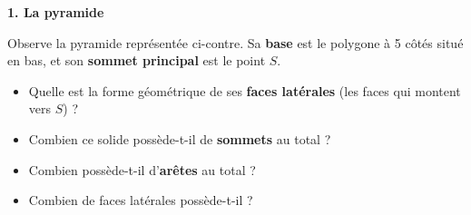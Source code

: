 \documentclass[a4paper]{book}
\begin{document}
\setcounter{chapter}{14} 
\renewcommand{\monTitre}{Pyramides et cônes}

\enteteActivite{1}{\monTitre}{\thechapter}


    \begin{exercice}
        \textbf{1. La pyramide} \\
        \begin{minipage}{0.55\textwidth}
            Observe la pyramide représentée ci-contre. Sa \textbf{base} est le polygone à 5 côtés situé en bas, et son \textbf{sommet principal} est le point $S$.
            \begin{itemize}
                \item Quelle est la forme géométrique de ses \textbf{faces latérales} (les faces qui montent vers $S$) ? \dotfill
                \item Combien ce solide possède-t-il de \textbf{sommets} au total ? \dotfill
                \item Combien possède-t-il d'\textbf{arêtes} au total ? \dotfill
                \item Combien de faces latérales possède-t-il ? \dotfill
            \end{itemize}
        \end{minipage}
        \hfill
        \begin{minipage}{0.4\textwidth}
            \centering
\end{minipage}
\end{exercice}
\end{document}
